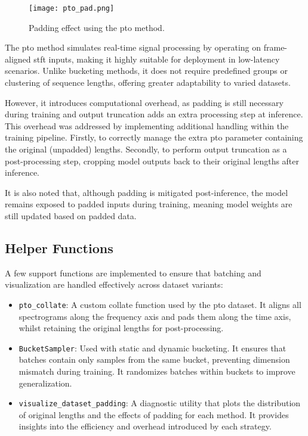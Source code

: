 \begin{figure}[H]
    \centering
    \texttt{[image: pto\_pad.png]}
    \caption{Padding effect using the \gls{pto} method.}
    \label{fig:pto_pad}
\end{figure}

The \gls{pto} method simulates real-time signal processing by operating on frame-aligned \gls{stft} inputs, making it highly suitable for deployment in low-latency scenarios. Unlike bucketing methods, it does not require predefined groups or clustering of sequence lengths, offering greater adaptability to varied datasets.

However, it introduces computational overhead, as padding is still necessary during training and output truncation adds an extra processing step at inference. This overhead was addressed by implementing additional handling within the training pipeline. Firstly, to correctly manage the extra \gls{pto} parameter containing the original (unpadded) lengths. Secondly, to perform output truncation as a post-processing step, cropping model outputs back to their original lengths after inference.

It is also noted that, although padding is mitigated post-inference, the model remains exposed to padded inputs during training, meaning model weights are still updated based on padded data. 

\subsection{Helper Functions}
\label{subsec:helper_functions}

A few support functions are implemented to ensure that batching and visualization are handled effectively across dataset variants:

\begin{itemize}
    \item \texttt{pto\_collate}: A custom collate function used by the \gls{pto} dataset. It aligns all spectrograms along the frequency axis and pads them along the time axis, whilst retaining the original lengths for post-processing.
    \item \texttt{BucketSampler}: Used with static and dynamic bucketing. It ensures that batches contain only samples from the same bucket, preventing dimension mismatch during training. It randomizes batches within buckets to improve generalization.
    \item \texttt{visualize\_dataset\_padding}: A diagnostic utility that plots the distribution of original lengths and the effects of padding for each method. It provides insights into the efficiency and overhead introduced by each strategy.
\end{itemize}


